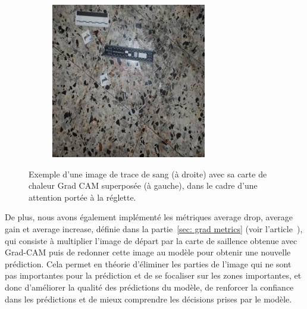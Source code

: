 \begin{figure}[ht]
\begin{subfigure}{0.40\linewidth}
        \includegraphics[width=\linewidth]{../asset/exemple/attention_reglette_image.jpg}
    \end{subfigure}
    \caption{Exemple d'une image  de trace de sang (à droite) avec sa carte de chaleur Grad CAM superposée (à gauche), dans le cadre d'une attention portée à la réglette.}
    \label{fig:grad_cam reglette}
\end{figure}





De plus, nous avons également implémenté les métriques average drop, average gain et average increase, définie dans la partie~\ref{sec: grad metrics} (voir l'article~\cite{opticam}), qui consiste à multiplier l'image de départ par la carte de saillence obtenue avec Grad-CAM puis de redonner cette image au modèle
pour obtenir une nouvelle prédiction.
Cela permet en théorie d'éliminer les parties de l'image qui ne sont pas importantes pour la prédiction et de se focaliser sur les zones importantes, et 
donc d'améliorer la qualité des prédictions du modèle, de renforcer la confiance dans les prédictions et de mieux comprendre les décisions prises par le modèle.

